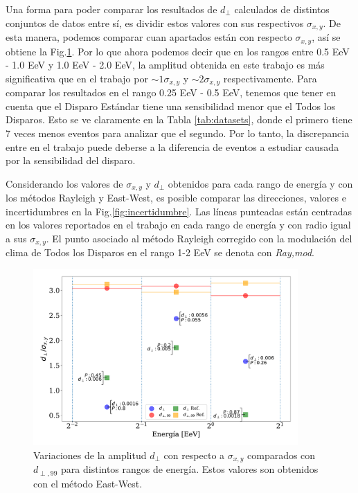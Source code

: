     Una forma  para poder comparar los resultados de $d_\perp$ calculados de distintos conjuntos de  datos entre sí, es dividir estos valores con  sus respectivos $\sigma_{x,y}$. De esta manera, podemos comparar cuan apartados están con respecto $\sigma_{x,y}$, así se obtiene la Fig.\ref{fig:normalizado_sigma}. Por lo que ahora podemos decir que en los rangos entre 0.5 EeV - 1.0 EeV y 1.0 EeV - 2.0 EeV, la amplitud obtenida en este trabajo es más significativa que en el trabajo \cite{Aab_2020} por $\sim 1\sigma_{x,y}$ y $\sim 2 \sigma_{x,y}$ respectivamente. Para comparar los resultados en el  rango 0.25 EeV - 0.5 EeV, tenemos que tener en cuenta que el Disparo Estándar tiene una sensibilidad menor que el Todos los Disparos. Esto se ve claramente en la Tabla \ref{tab:datasets}, donde el primero tiene 7 veces menos eventos para analizar que el segundo. Por lo tanto, la discrepancia entre en el trabajo \cite{Aab_2020} puede deberse a la  diferencia de eventos a estudiar causada por la sensibilidad del disparo.



    Considerando los valores de $\sigma_{x,y}$ y $d_\perp$ obtenidos para cada rango de energía y con los métodos Rayleigh y East-West, es posible  comparar las direcciones, valores e incertidumbres en la Fig.\ref{fig:incertidumbre}. Las líneas punteadas están centradas en los valores reportados en el trabajo \cite{Aab_2020} en cada rango de energía y con radio igual a sus $\sigma_{x,y}$. El punto asociado al método Rayleigh corregido con la modulación del clima de Todos los Disparos en el rango 1-2 EeV se denota con \emph{Ray,mod}.

    \begin{figure}[H]
        \begin{small}
            \begin{center}
                \vspace*{-0.21 cm}
                \includegraphics[width=0.9\textwidth]{d_perp_normalizado_sigmas_v6.pdf}
                \vspace*{-1 cm}
            \end{center}
            \caption{Variaciones de la amplitud $d_\perp$ con respecto a $\sigma_{x,y}$ comparados con $d_{\perp,99}$ para distintos rangos de energía. Estos valores son obtenidos con el método East-West. }
            \label{fig:normalizado_sigma}
        \end{small}
    \end{figure}




